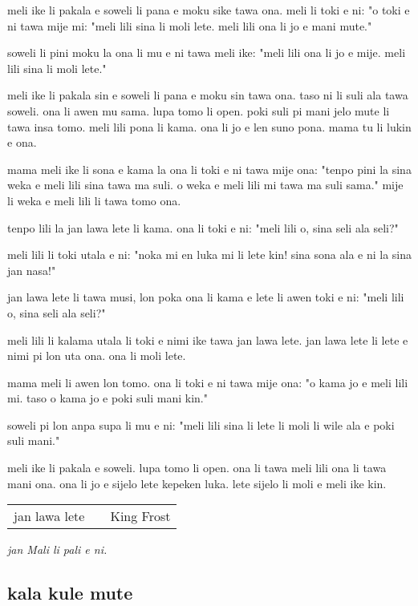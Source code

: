 meli ike li pakala e soweli li pana e moku sike tawa ona. 
meli li toki e ni: 
"o toki e ni tawa mije mi: 
"meli lili sina li moli lete. 
meli lili ona li jo e mani mute."

soweli li pini moku la ona li mu e ni tawa meli ike: 
"meli lili ona li jo e mije. 
meli lili sina li moli lete."

meli ike li pakala sin e soweli li pana e moku sin tawa ona. 
taso ni li suli ala tawa soweli. 
ona li awen mu sama. 
lupa tomo li open. 
poki suli pi mani jelo mute li tawa insa tomo. 
meli lili pona li kama. 
ona li jo e len suno pona. 
mama tu li lukin e ona.

mama meli ike li sona e kama la ona li toki e ni tawa mije ona: 
"tenpo pini la sina weka e meli lili sina tawa ma suli. 
o weka e meli lili mi tawa ma suli sama." 
mije li weka e meli lili li tawa tomo ona.

tenpo lili la jan lawa lete li kama. 
ona li toki e ni: 
"meli lili o, sina seli ala seli?"

meli lili li toki utala e ni: 
"noka mi en luka mi li lete kin! 
sina sona ala e ni la sina jan nasa!"

jan lawa lete li tawa musi, lon poka ona li kama e lete li awen toki e ni: 
"meli lili o, sina seli ala seli?"

meli lili li kalama utala li toki e nimi ike tawa jan lawa lete. 
jan lawa lete li lete e nimi pi lon uta ona. 
ona li moli lete.

mama meli li awen lon tomo. 
ona li toki e ni tawa mije ona: 
"o kama jo e meli lili mi. 
taso o kama jo e poki suli mani kin."

soweli pi lon anpa supa li mu e ni: 
"meli lili sina li lete li moli li wile ala e poki suli mani."

meli ike li pakala e soweli. 
lupa tomo li open. 
ona li tawa meli lili ona li tawa mani ona. 
ona li jo e sijelo lete kepeken luka. 
lete sijelo li moli e meli ike kin.

\begin{supertabular}{p{5,5cm}|ll}
jan lawa lete  && King Frost  \\
\end{supertabular}

\textit{jan Mali li pali e ni. \cite{www:astrodonunt:01}}
%
\subsection{kala kule mute}

